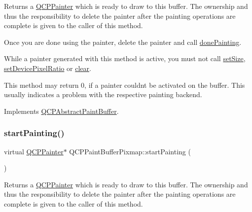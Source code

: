 Returns a \hyperlink{class_q_c_p_painter}{Q\+C\+P\+Painter} which is ready to draw to this buffer. The ownership and thus the responsibility to delete the painter after the painting operations are complete is given to the caller of this method.

Once you are done using the painter, delete the painter and call \hyperlink{class_q_c_p_abstract_paint_buffer_a41b0dc6e7744f19fae09f8532c207dc1}{done\+Painting}.

While a painter generated with this method is active, you must not call \hyperlink{class_q_c_p_abstract_paint_buffer_a8b68c3cd36533f1a4a23b5ce8cd66f01}{set\+Size}, \hyperlink{class_q_c_p_abstract_paint_buffer_a555eaad5d5c806420ff35602a1bb68fa}{set\+Device\+Pixel\+Ratio} or \hyperlink{class_q_c_p_paint_buffer_pixmap_a14badbd010a3cde6b55817ccb7b65217}{clear}.

This method may return 0, if a painter couldn\textquotesingle{}t be activated on the buffer. This usually indicates a problem with the respective painting backend. 

Implements \hyperlink{class_q_c_p_abstract_paint_buffer_a9e9f29b19c033cf02fb96f1a148463f3}{Q\+C\+P\+Abstract\+Paint\+Buffer}.

\mbox{\label{class_q_c_p_paint_buffer_pixmap_a0b919d080c2551ee35aedccebde0a67d}} 
\subsubsection{\texorpdfstring{start\+Painting()}{startPainting()}\hspace{0.1cm}{\footnotesize\ttfamily [2/2]}}
{\footnotesize\ttfamily virtual \hyperlink{class_q_c_p_painter}{Q\+C\+P\+Painter}$\ast$ Q\+C\+P\+Paint\+Buffer\+Pixmap\+::start\+Painting (\begin{DoxyParamCaption}{ }\end{DoxyParamCaption})\hspace{0.3cm}{\ttfamily [virtual]}}

Returns a \hyperlink{class_q_c_p_painter}{Q\+C\+P\+Painter} which is ready to draw to this buffer. The ownership and thus the responsibility to delete the painter after the painting operations are complete is given to the caller of this method.

